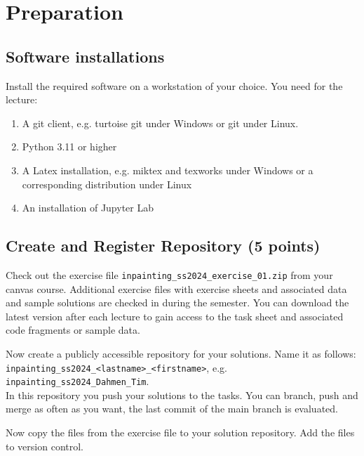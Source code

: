 \def\firstname{firstname}
\def\lastname{lastname}
\def\aufgabenblatt{1}




\thispagestyle{page1} 

\section{Preparation}

\subsection{Software installations}

Install the required software on a workstation of your choice. You need for the lecture:

\begin{enumerate}
\item A git client, e.g. turtoise git under Windows or git under Linux.
\item Python 3.11 or higher 
\item A Latex installation, e.g. miktex and texworks under Windows or a corresponding distribution under Linux
\item An installation of Jupyter Lab
\end{enumerate}

\subsection{Create and Register Repository (5 points)}

Check out the exercise file \texttt{inpainting\_ss2024\_exercise\_01.zip} from your canvas course. Additional exercise files with exercise sheets and associated data and sample solutions are checked in during the semester. You can download the latest version after each lecture to gain access to the task sheet and associated code fragments or sample data.

Now create a publicly accessible repository for your solutions. Name it as follows: \\ 
\texttt{inpainting\_ss2024\_<lastname>\_<firstname>}, e.g. \texttt{inpainting\_ss2024\_Dahmen\_Tim}. \\ 
In this repository you push your solutions to the tasks. You can branch, push and merge as often as you want, the last commit of the main branch is evaluated. 

Now copy the files from the exercise file to your solution repository. Add the files to version control. 

